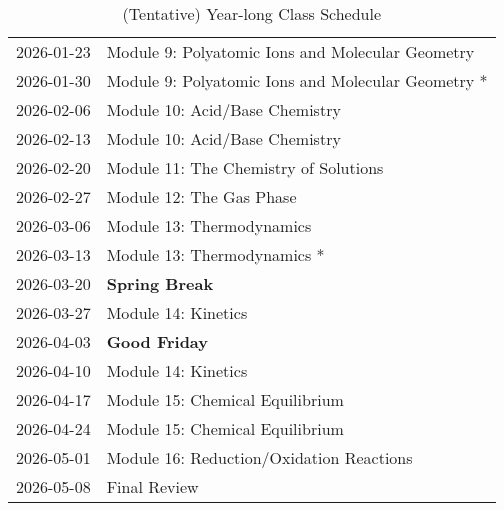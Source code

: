 \documentclass[11pt, oneside]{article}   	%
\begin{document}
\begin{table}[h]
\begin{tabular}{ l | l }
2026-01-23 & Module 9: Polyatomic Ions and Molecular Geometry \\
2026-01-30 & Module 9: Polyatomic Ions and Molecular Geometry * \\
2026-02-06 & Module 10: Acid/Base Chemistry \\
2026-02-13 & Module 10: Acid/Base Chemistry \\
2026-02-20 & Module 11: The Chemistry of Solutions \\
2026-02-27 & Module 12: The Gas Phase \\
2026-03-06 & Module 13: Thermodynamics \\
2026-03-13 & Module 13: Thermodynamics * \\
2026-03-20 & \textbf{Spring Break} \\
2026-03-27 & Module 14: Kinetics \\
2026-04-03 & \textbf{Good Friday} \\
2026-04-10 & Module 14: Kinetics \\
2026-04-17 & Module 15: Chemical Equilibrium \\
2026-04-24 & Module 15: Chemical Equilibrium \\
2026-05-01 & Module 16: Reduction/Oxidation Reactions \\
2026-05-08 & Final Review \\
\end{tabular}
\caption{(Tentative) Year-long Class Schedule}\label{table:class-schedule-year}
\end{table}
\end{document}
